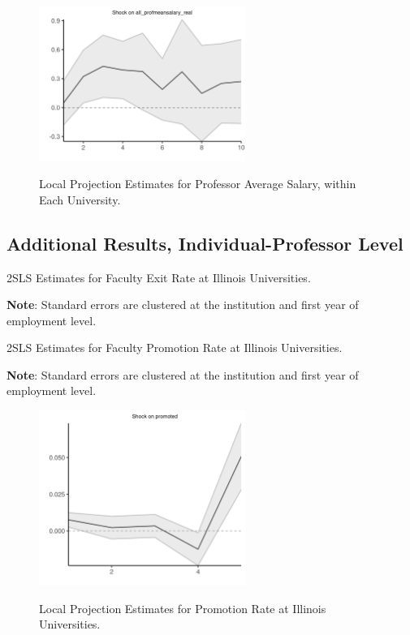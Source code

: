 \documentclass[notitlepage,12pt]{article}
\begin{document}
\begin{figure}[h!]
    \centering
    \caption{Local Projection Estimates for Professor Average Salary, within Each University.}
    \includegraphics[width=0.6\textwidth]{figures/all-salaries-lp.png}
    \label{fig:all-salaries-lp}
\end{figure}


\subsection{Additional Results, Individual-Professor Level}

\begin{table}[H]
    \onehalfspacing
    \centering
    \caption{2SLS Estimates for Faculty Exit Rate at Illinois Universities.}
    \makebox[\textwidth][c]{}
    \begin{flushleft}
        \footnotesize
        \textbf{Note}: Standard errors are clustered at the institution and first year of employment level.
    \end{flushleft}
    \label{tab:facultyleaving-shock-illinois}
\end{table}

\begin{table}[!h]
    \onehalfspacing
    \centering
    \caption{2SLS Estimates for Faculty Promotion Rate at Illinois Universities.}
    \makebox[\textwidth][c]{}
    \begin{flushleft}
        \footnotesize
        \textbf{Note}: Standard errors are clustered at the institution and first year of employment level.
    \end{flushleft}
    \label{tab:promotion-shock-illinois}
\end{table}

\begin{figure}[H]
    \centering
    \caption{Local Projection Estimates for Promotion Rate at Illinois Universities.}
    \includegraphics[width=0.6\textwidth]{figures/promoted-illinois-lp-rolling.png}
    \label{fig:promoted-illinois-lp}
\end{figure}
\end{document}

